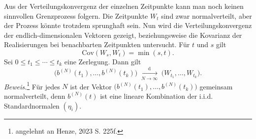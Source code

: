 \begin{satz}
Aus der Verteilungskonvergenz der einzelnen Zeitpunkte kann man noch keinen sinnvollen Grenzprozess folgern.
Die Zeitpunkte $W_t$ sind zwar normalverteilt, aber der Prozess könnte trotzdem sprunghaft sein.
Nun wird die Verteilungskonvergenz der endlich-dimensionalen Vektoren gezeigt, beziehungsweise
die Kovarianz der Realisierungen bei benachbarten Zeitpunkten untersucht. Für $t$ und $s$ gilt 
$$
\mathrm{Cov}(W_s, W_t) = \min(s,t).
$$
Sei $0\le t_1\le\cdots\le t_k$ eine Zerlegung. Dann gilt
$$
\big(b^{(N)}(t_1), \dots , b^{(N)}(t_k) \big )\;\xrightarrow[N \to \infty]{\mathrm{d}}\;\big(W_{t_1},\dots,W_{t_k}\big).
$$
\textit{Beweis.}\footnote{angelehnt an Henze, 2023 \cite{henze} S. 225f.}
Für jedes $N$ ist der Vektor $\big(b^{(N)}(t_1),\dots,b^{(N)}(t_k)\big)$ gemeinsam normalverteilt,
denn $b^{(N)}(t)$ ist eine lineare Kombination der i.i.d. Standardnormalen $(\eta_i)$.


\end{satz}
